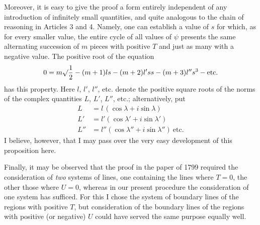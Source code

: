 Moreover, it is easy to give the proof a form entirely independent of any introduction of infinitely small quantities, and quite analogous to the chain of reasoning in Articles 3 and 4. Namely, one can establish a value of $s$ for which, as for every smaller value, the entire cycle of all values of $\psi$ presents the same alternating succession of $m$ pieces with positive $T$ and just as many with a negative value. The positive root of the equation
\[
0=m\surd\frac{1}{2}-(m+1)ls-(m+2)l'ss-(m+3)l''s^3-\mbox{etc.}
\]
has this property. Here $l$, $l'$, $l''$, etc. denote the positive square roots of the norms of the complex quantities $L$, $L'$, $L''$, etc.; alternatively, put
\[
\begin{array}{rl}
L&=l\,(\cos\lambda+i\sin\lambda)\\
L'&=l'(\cos\lambda'+i\sin\lambda')\\
L''&=l''(\cos\lambda''+i\sin\lambda'')\ \mbox{etc.}
\end{array}
\]
I believe, however, that I may pass over the very easy development of this proposition here.

Finally, it may be observed that the proof in the paper of 1799 required the consideration of \emph{two} systems of lines, one containing the lines where $T=0$, the other those where $U=0$, whereas in our present procedure the consideration of one system has sufficed. For this I chose the system of boundary lines of the regions with positive $T$, but consideration of the boundary lines of the regions with positive (or negative) $U$ could have served the same purpose equally well.

